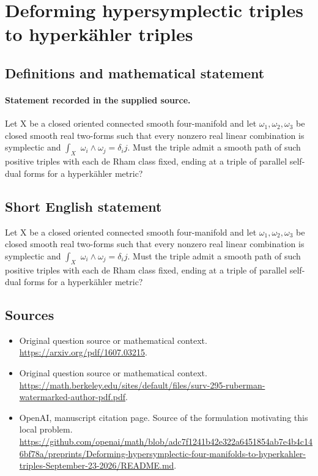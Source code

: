 \documentclass[11pt]{article}
\begin{document}
\section*{Deforming hypersymplectic triples to hyperkähler triples}\label{30007144}
\subsection{Definitions and mathematical statement}
\paragraph{Statement recorded in the supplied source.}
Let X be a closed oriented connected smooth four-manifold and let $\omega _{1},\omega _{2},\omega _{3}$ be closed smooth real two-forms such that every nonzero real linear combination is symplectic and $\int _X$ $\omega _i\wedge \omega _j=\delta _ij$. Must the triple admit a smooth path of such positive triples with each de Rham class fixed, ending at a triple of parallel self-dual forms for a hyperkähler metric?
\subsection{Short English statement}
Let X be a closed oriented connected smooth four-manifold and let $\omega _{1},\omega _{2},\omega _{3}$ be closed smooth real two-forms such that every nonzero real linear combination is symplectic and $\int _X$ $\omega _i\wedge \omega _j=\delta _ij$. Must the triple admit a smooth path of such positive triples with each de Rham class fixed, ending at a triple of parallel self-dual forms for a hyperkähler metric?
\subsection{Sources}
\begin{itemize}
\item[S1] Original question source or mathematical context.
\url{https://arxiv.org/pdf/1607.03215}.
\item[S2] Original question source or mathematical context.
\url{https://math.berkeley.edu/sites/default/files/surv-295-ruberman-watermarked-author-pdf.pdf}.
\item[S3] OpenAI, manuscript citation page. Source of the formulation motivating this local problem.
\url{https://github.com/openai/math/blob/adc7f1241b42e322a6451854ab7e4b4c146bf78a/preprints/Deforming-hypersymplectic-four-manifolds-to-hyperkahler-triples-September-23-2026/README.md}.
\end{itemize}
\end{document}
